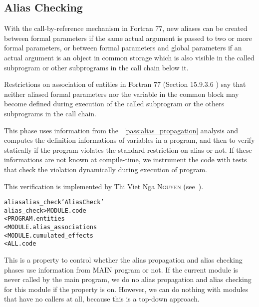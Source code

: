 \documentclass[a4paper]{report}
\newenvironment{PipsMake}{\begin{alltt}}{\end{alltt}}
\newcommand{\PipsPassRef}[1]{\texttt{\detokenize{#1}}~\ref{pass:#1}}
\newenvironment{PipsPass}[1]{\label{pass:#1}}{}
\begin{document}
\subsection{Alias Checking}
\label{subsubsection-alias-check}

\begin{PipsPass}{alias_check}

With the call-by-reference mechanism in Fortran 77, new aliases can be
created between formal parameters if the
same actual argument is passed to two or more formal parameters, or between formal
parameters and global parameters if an actual
argument is an object in common storage which is also visible in the
called subprogram or other subprograms in the call chain below it.

Restrictions on association of entities in Fortran 77 (Section 15.9.3.6
\cite{ANSI83}) say that neither aliased formal parameters nor the variable in the
common block may become defined during execution
of the called subprogram or the others subprograms in the call chain.

This phase uses information from the \PipsPassRef{alias_propagation}
analysis and computes the definition
informations of variables in a program, and then to verify
statically if the program violates the standard restriction on alias or
not. If these informations are not known at compile-time, we instrument
the code with tests that check the violation dynamically during
execution of program.

This verification is implemented by Thi Viet Nga \textsc{Nguyen} (see~\cite{Ngu02}).
\end{PipsPass}


\begin{PipsMake}
alias alias_check 'Alias Check'
alias_check   > MODULE.code
        < PROGRAM.entities
        < MODULE.alias_associations
        < MODULE.cumulated_effects
        < ALL.code
\end{PipsMake}

This is a property to control whether the alias propagation and alias checking
phases use information from MAIN program or not. If the current
module is never called by the main program, we do no alias propagation
and alias checking for this module if the property is on. However, we
can do nothing with modules that have no callers at all, because this
is a top-down approach.
\end{document}
